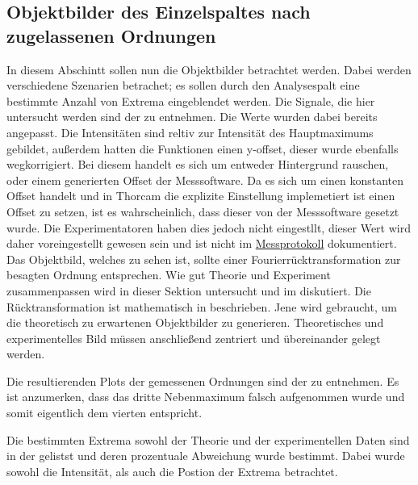 \subsection[Objektbilder]{Objektbilder des Einzelspaltes nach zugelassenen Ordnungen}
In diesem Abschintt sollen nun die Objektbilder betrachtet werden. Dabei werden verschiedene Szenarien betrachet; es sollen durch den Analysespalt eine bestimmte Anzahl von Extrema eingeblendet werden. Die Signale, die hier untersucht werden sind der  zu entnehmen. Die Werte wurden dabei bereits angepasst. Die Intensitäten sind reltiv zur Intensität des Hauptmaximums gebildet, außerdem hatten die Funktionen einen y-offset, dieser wurde ebenfalls wegkorrigiert. Bei diesem handelt es sich um entweder Hintergrund rauschen, oder einem generierten Offset der Messsoftware. Da es sich um einen konstanten Offset handelt und in Thorcam die explizite Einstellung implemetiert ist einen Offset zu setzen, ist es wahrscheinlich, dass dieser von der Messsoftware gesetzt wurde. Die Experimentatoren haben dies jedoch nicht eingestllt, dieser Wert wird daher voreingestellt gewesen sein und ist nicht im \hyperref[ch:Protokoll]{Messprotokoll} dokumentiert.
Das Objektbild, welches zu sehen ist, sollte einer Fourierrücktransformation zur besagten Ordnung entsprechen. Wie gut Theorie und Experiment zusammenpassen wird in dieser Sektion untersucht und im  diskutiert.
Die Rücktransformation ist mathematisch in  beschrieben. Jene wird gebraucht, um die theoretisch zu erwartenen Objektbilder zu generieren. Theoretisches und experimentelles Bild müssen anschließend zentriert und übereinander gelegt werden. 


Die resultierenden Plots der gemessenen Ordnungen sind der  zu entnehmen. Es ist anzumerken, dass das dritte Nebenmaximum falsch aufgenommen wurde und somit eigentlich dem vierten entspricht.

Die bestimmten Extrema sowohl der Theorie und der experimentellen Daten sind in der  gelistst und deren prozentuale Abweichung wurde bestimmt. Dabei wurde sowohl die Intensität, als auch die Postion der Extrema betrachtet.

